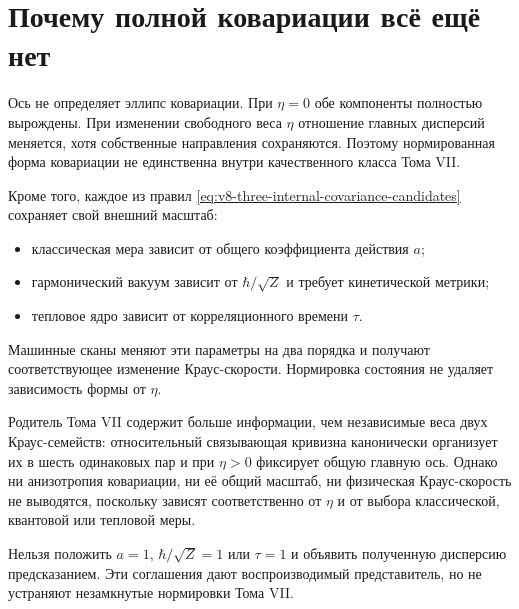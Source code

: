 \section{Почему полной ковариации всё ещё нет}

Ось не определяет эллипс ковариации. При $\eta=0$ обе компоненты полностью
вырождены. При изменении свободного веса $\eta$ отношение главных дисперсий
меняется, хотя собственные направления сохраняются. Поэтому нормированная
форма ковариации не единственна внутри качественного класса Тома VII.

Кроме того, каждое из правил \eqref{eq:v8-three-internal-covariance-candidates}
сохраняет свой внешний масштаб:
\begin{itemize}
 \item классическая мера зависит от общего коэффициента действия $a$;
 \item гармонический вакуум зависит от $\hbar/\sqrt Z$ и требует
 кинетической метрики;
 \item тепловое ядро зависит от корреляционного времени $\tau$.
\end{itemize}
Машинные сканы меняют эти параметры на два порядка и получают
соответствующее изменение Краус-скорости. Нормировка состояния не удаляет
зависимость формы от $\eta$.

\begin{theorem}
Родитель Тома VII содержит больше информации, чем независимые веса двух
Краус-семейств: относительный связывающая кривизна канонически организует их в шесть
одинаковых пар и при $\eta>0$ фиксирует общую главную ось. Однако ни
анизотропия ковариации, ни её общий масштаб, ни физическая Краус-скорость не
выводятся, поскольку зависят соответственно от $\eta$ и от выбора
классической, квантовой или тепловой меры.
\end{theorem}

\begin{nogocriterion}
Нельзя положить $a=1$, $\hbar/\sqrt Z=1$ или $\tau=1$ и объявить полученную
дисперсию предсказанием. Эти соглашения дают воспроизводимый представитель,
но не устраняют незамкнутые нормировки Тома VII.
\end{nogocriterion}

